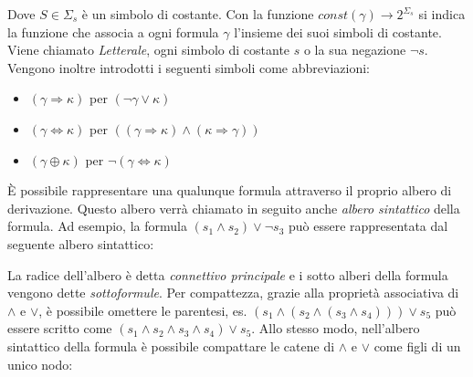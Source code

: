 \documentclass[./main.tex]{subfiles}
\begin{document}
Dove $S \in \Sigma_s$ è un simbolo di costante. Con la funzione $const(\gamma) \rightarrow 2^{\Sigma_s}$ si indica la funzione che
associa a ogni formula $\gamma$ l'insieme dei suoi simboli di costante. 
Viene chiamato \textit{Letterale}, ogni simbolo di costante $s$ o la sua negazione $\lnot s$.
Vengono inoltre introdotti i seguenti simboli come abbreviazioni:

\begin{itemize}
    \item $(\gamma \Rightarrow \kappa)$ per $(\lnot \gamma \lor \kappa)$
    \item $(\gamma \Leftrightarrow \kappa)$ per $((\gamma \Rightarrow \kappa) \land (\kappa \Rightarrow \gamma))$
    \item $(\gamma \oplus \kappa)$ per $\lnot(\gamma \Leftrightarrow \kappa)$
\end{itemize}

È possibile rappresentare una qualunque formula attraverso il proprio albero di derivazione. Questo albero 
verrà chiamato in seguito anche \textit{albero sintattico} della formula. Ad esempio, la formula 
$(s_1 \land s_2) \lor \lnot s_3$ può essere rappresentata dal seguente albero sintattico:

\begin{center}
\end{center}


La radice dell'albero è detta \textit{connettivo principale} e i sotto alberi della formula vengono dette \textit{sottoformule}.
 Per compattezza, grazie alla proprietà associativa di $\land$ e $\lor$, è possibile omettere le parentesi, es. 
$(s_1 \land (s_2 \land (s_3 \land s_4))) \lor s_5$ può essere scritto come $(s_1 \land s_2 \land s_3 \land s_4) \lor s_5$. 
Allo stesso modo, nell'albero sintattico della formula è possibile compattare le catene di $\land$ e $\lor$ come figli di un unico nodo:

\begin{center}
\end{center}
\end{document}
